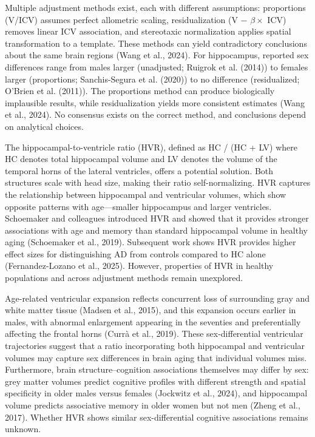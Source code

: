 \documentclass[
]{article}
\begin{document}
Multiple adjustment methods exist, each with different assumptions:
proportions (V/ICV) assumes perfect allometric scaling, residualization
(V \(-\) \(\beta \times\) ICV) removes linear ICV association, and
stereotaxic normalization applies spatial transformation to a template.
These methods can yield contradictory conclusions about the same brain
regions (Wang et al., 2024). For hippocampus, reported sex differences
range from males larger (unadjusted; Ruigrok et al. (2014)) to females
larger (proportions; Sanchis-Segura et al. (2020)) to no difference
(residualized; O'Brien et al. (2011)). The proportions method can
produce biologically implausible results, while residualization yields
more consistent estimates (Wang et al., 2024). No consensus exists on
the correct method, and conclusions depend on analytical choices.

The hippocampal-to-ventricle ratio (HVR), defined as HC / (HC + LV)
where HC denotes total hippocampal volume and LV denotes the volume of
the temporal horns of the lateral ventricles, offers a potential
solution. Both structures scale with head size, making their ratio
self-normalizing. HVR captures the relationship between hippocampal and
ventricular volumes, which show opposite patterns with age---smaller
hippocampus and larger ventricles. Schoemaker and colleagues introduced
HVR and showed that it provides stronger associations with age and
memory than standard hippocampal volume in healthy aging (Schoemaker et
al., 2019). Subsequent work shows HVR provides higher effect sizes for
distinguishing AD from controls compared to HC alone (Fernandez-Lozano
et al., 2025). However, properties of HVR in healthy populations and
across adjustment methods remain unexplored.

Age-related ventricular expansion reflects concurrent loss of
surrounding gray and white matter tissue (Madsen et al., 2015), and this
expansion occurs earlier in males, with abnormal enlargement appearing
in the seventies and preferentially affecting the frontal horns (Currà
et al., 2019). These sex-differential ventricular trajectories suggest
that a ratio incorporating both hippocampal and ventricular volumes may
capture sex differences in brain aging that individual volumes miss.
Furthermore, brain structure--cognition associations themselves may
differ by sex: grey matter volumes predict cognitive profiles with
different strength and spatial specificity in older males versus females
(Jockwitz et al., 2024), and hippocampal volume predicts associative
memory in older women but not men (Zheng et al., 2017). Whether HVR
shows similar sex-differential cognitive associations remains unknown.
\end{document}

